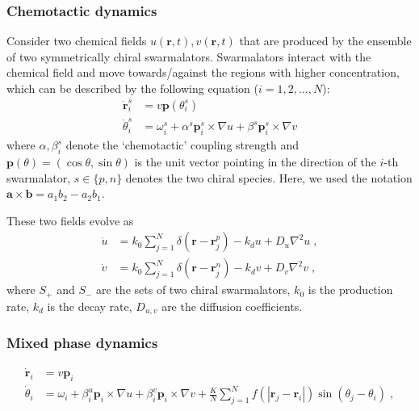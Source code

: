 \documentclass{article}
\begin{document}
\subsubsection{Chemotactic dynamics}

Consider two chemical fields $u\left( \mathbf{r},t \right), v\left( \mathbf{r},t \right)$ that are produced by the ensemble of two symmetrically chiral swarmalators. Swarmalators interact with the chemical field and move towards/against the regions with higher concentration, which can be described by the following equation ($i=1, 2, \dots, N$):
\begin{subequations}
    \begin{align}
        \dot{\mathbf{r}}_{i}^{s}&=v\mathbf{p}\left(\theta_{i}^{s}\right)\\
        \dot{\theta}_{i}^{s}&=\omega _{i}^{s}+\alpha ^{s}\mathbf{p}_{i}^{s}\times \nabla u+\beta ^{s}\mathbf{p}_{i}^{s}\times \nabla v
    \end{align}
\end{subequations}
where $\alpha, \beta _{i}^{s}$ denote the ‘chemotactic’ coupling strength and $\mathbf{p}\left(\theta\right)=(\cos \theta,\sin \theta )$ is the unit vector pointing in the direction of the $i$-th swarmalator, $s\in\{p, n\}$ denotes the two chiral species. Here, we used the notation $\mathbf{a}\times\mathbf{b}=a_1 b_2-a_2 b_1$.

These two fields evolve as
\begin{subequations}
    \begin{align}
    \dot{u}&=k_0\sum_{j=1}^N{\delta \left( \mathbf{r}-\mathbf{r}_{j}^{p} \right)}-k_du+D_u\nabla ^2u\;,\\
    \dot{v}&=k_0\sum_{j=1}^N{\delta \left( \mathbf{r}-\mathbf{r}_{j}^{n} \right)}-k_dv+D_v\nabla ^2v\;,
    \end{align}
\end{subequations}
where $S_+$ and $S_-$ are the sets of two chiral swarmalators, $k_0$ is the production rate, $k_d$ is the decay rate, $D_{u,v}$ are the diffusion coefficients.

\subsubsection{Mixed phase dynamics}
\begin{subequations}
    \begin{align}
        \dot{\mathbf{r}}_i&=v\mathbf{p}_i\\
        \dot{\theta}_i&=\omega _i+\beta _{i}^{u}\mathbf{p}_i\times \nabla u+\beta _{i}^{v}\mathbf{p}_i\times \nabla v+\frac{K}{N}\sum_{j=1}^N{f}\left( \left| \mathbf{r}_j-\mathbf{r}_i \right| \right) \sin \left( \theta _j-\theta _i \right) \;,
    \end{align}
\end{subequations}
\end{document}
